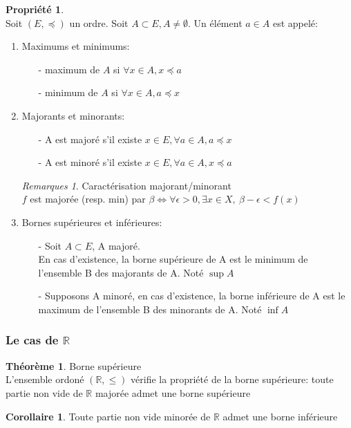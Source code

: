 \documentclass[fleqn]{article}
\theoremstyle{definition} \newtheorem*{defi}{D\'efinition}
\theoremstyle{definition} \newtheorem*{theo}{Th\'eor\`eme}
\theoremstyle{definition} \newtheorem*{coro}{Corollaire}
\theoremstyle{remark} \newtheorem*{rqs}{Remarques}
\theoremstyle{definition} \newtheorem*{prop}{Propri\'et\'e}
\begin{document}
\begin{prop} $ $ \\ Soit \((E, \preceq)\) un ordre. Soit \(A \subset E, A \neq \emptyset\). Un \'el\'ement \(a \in A\) est appel\'e:
	\begin{enumerate}
		\item Maximums et minimums:
			\begin{itemize}
				\item [-] maximum de \(A\) si \(\forall x \in A, x \preceq a\)
				\item [-] minimum de \(A\) si \(\forall x \in A, a \preceq x\)
			\end{itemize}
		\item Majorants et minorants:
			\begin{itemize}
				\item [-] A est major\'e s'il existe \(x \in E, \forall a \in A, a \preceq x\)
				\item [-] A est minor\'e s'il existe \(x \in E, \forall a \in A, x \preceq a\)
			\end{itemize}
			\begin{rqs} Caract\'erisation majorant/minorant\\
				$f$ est major\'ee (resp. min) par $\beta \Leftrightarrow \forall \epsilon > 0, \exists x \in X,\ \beta - \epsilon < f(x)$
			\end{rqs}
		\item Bornes sup\'erieures et inf\'erieures:
			\begin{itemize}
				\item [-] Soit \(A \subset E\), A major\'e. \\
					En cas d'existence, la borne sup\'erieure de A est le minimum de l'ensemble B des majorants de A. Not\'e $\sup A$
				\item [-] Supposons A minor\'e, en cas d'existence, la borne inf\'erieure de A est le maximum de l'ensemble B des minorants de A.
					Not\'e $\inf A$ \\
			\end{itemize}
	\end{enumerate}
\end{prop}

\subsubsection{Le cas de $\mathbb{R}$}
\begin{theo} Borne sup\'erieure \\
	L'ensemble ordon\'e $(\mathbb{R}, \leq)$ v\'erifie la propri\'et\'e de la borne sup\'erieure: toute partie non vide de $\mathbb{R}$
	major\'ee admet une borne sup\'erieure
\end{theo}

\begin{coro}
	Toute partie non vide minor\'ee de $\mathbb{R}$ admet une borne inf\'erieure
\end{coro}
\end{document}
